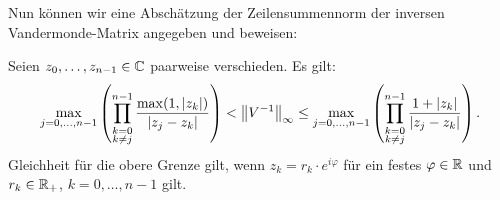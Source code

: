Nun können wir eine Abschätzung der Zeilensummennorm der inversen
Vandermonde-Matrix angegeben und beweisen:
\begin{theorem}
  \label{thm:inverse_vandermonde_inequality}
  Seien $z_0, \dots, z_{n-1} \in \mathbb{C}$ paarweise verschieden.
  Es gilt:
  \begin{equation}
    \label{eq:inverse_vandermonde_inequality}
    \max_{j = 0, \dots, n-1} \left( \prod_{\substack{k = 0\\ k \neq j}}^{n-1} \frac{\max(1, \left\lvert z_k \right\rvert)}{\left\lvert z_j - z_k \right\rvert} \right)
    < \left\lVert V^{-1} \right\rVert_{\infty}
    \leq \max_{j = 0, \dots, n-1} \left( \prod_{\substack{k = 0\\ k \neq j}}^{n-1} \frac{1 + \left\lvert z_k \right\rvert}{\left\lvert z_j - z_k \right\rvert} \right).
  \end{equation}
  Gleichheit für die obere Grenze gilt, wenn $z_k = r_k \cdot e^{i \varphi}$
  für ein festes $\varphi \in \mathbb{R}$ und $r_k \in \mathbb{R}_{+}$, $k = 0, \dots, n-1$ gilt.
\end{theorem}

